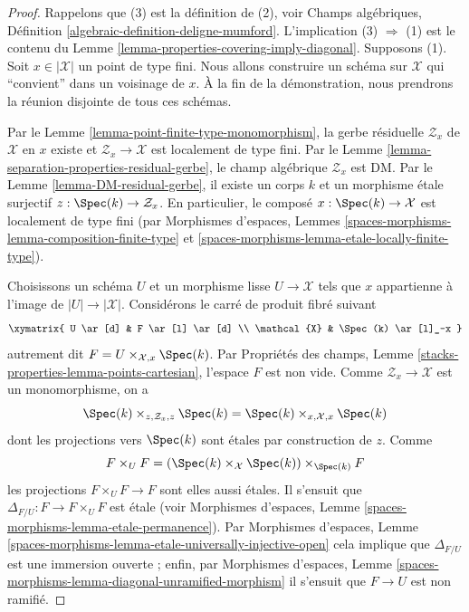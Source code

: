 \begin{proof}
Rappelons que (3) est la définition de (2), voir Champs algébriques,
Définition \ref{algebraic-definition-deligne-mumford}.
L'implication (3) $\Rightarrow$ (1) est le contenu du
Lemme \ref{lemma-properties-covering-imply-diagonal}.
Supposons (1). Soit $x \in |\mathcal{X}|$ un point de type fini.
Nous allons construire un schéma sur $\mathcal{X}$ qui ``convient'' dans un
voisinage de $x$. À la fin de la démonstration, nous prendrons la réunion
disjointe de tous ces schémas.

\medskip\noindent
Par le Lemme \ref{lemma-point-finite-type-monomorphism}, la gerbe résiduelle
$\mathcal{Z}_x$ de $\mathcal{X}$ en $x$ existe et
$\mathcal{Z}_x \to \mathcal{X}$ est localement de type fini. Par le
Lemme \ref{lemma-separation-properties-residual-gerbe}, le champ algébrique
$\mathcal{Z}_x$ est DM. Par le Lemme \ref{lemma-DM-residual-gerbe}, il existe
un corps $k$ et un morphisme étale surjectif
$z : \Spec(k) \to \mathcal{Z}_x$.
En particulier, le composé $x : \Spec(k) \to \mathcal{X}$ est localement de
type fini (par Morphismes d'espaces, Lemmes
\ref{spaces-morphisms-lemma-composition-finite-type} et
\ref{spaces-morphisms-lemma-etale-locally-finite-type}).

\medskip\noindent
Choisissons un schéma $U$ et un morphisme lisse $U \to \mathcal{X}$ tels que
$x$ appartienne à l'image de $|U| \to |\mathcal{X}|$.
Considérons le carré de produit fibré suivant
$$
\xymatrix{
U \ar[d] & F  \ar[l] \ar[d] \\
\mathcal{X} & \Spec(k) \ar[l]_-x
}
$$
autrement dit $F = U \times_{\mathcal{X}, x} \Spec(k)$. Par Propriétés des
champs, Lemme \ref{stacks-properties-lemma-points-cartesian}, l'espace $F$
est non vide. Comme $\mathcal{Z}_x \to \mathcal{X}$ est un monomorphisme,
on a
$$
\Spec(k) \times_{z, \mathcal{Z}_x, z} \Spec(k)
=
\Spec(k) \times_{x, \mathcal{X}, x} \Spec(k)
$$
dont les projections vers $\Spec(k)$ sont étales par construction de $z$.
Comme
$$
F \times_U F =
(\Spec(k) \times_\mathcal{X} \Spec(k))
\times_{\Spec(k)} F
$$
les projections $F \times_U F \to F$ sont elles aussi étales.
Il s'ensuit que $\Delta_{F/U} : F \to F \times_U F$ est étale (voir
Morphismes d'espaces, Lemme \ref{spaces-morphisms-lemma-etale-permanence}).
Par Morphismes d'espaces, Lemme
\ref{spaces-morphisms-lemma-etale-universally-injective-open}
cela implique que $\Delta_{F/U}$ est une immersion ouverte ; enfin, par
Morphismes d'espaces, Lemme
\ref{spaces-morphisms-lemma-diagonal-unramified-morphism}
il s'ensuit que $F \to U$ est non ramifié.


\end{proof}
